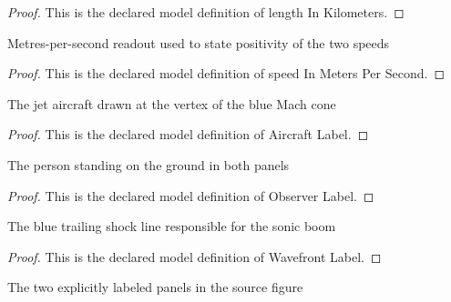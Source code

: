 \begin{proof}
  This is the declared model definition of length In Kilometers.
\end{proof}
\begin{definition}
  \label{def:physics:phyx-mini-0221:phyxminiproblems-problemphyxmini0221-speedinmeterspersecond}
  Metres-per-second readout used to state positivity of the two speeds
\end{definition}
\begin{proof}
  This is the declared model definition of speed In Meters Per Second.
\end{proof}
\begin{definition}
  \label{def:physics:phyx-mini-0221:phyxminiproblems-problemphyxmini0221-aircraftlabel}
  The jet aircraft drawn at the vertex of the blue Mach cone
\end{definition}
\begin{proof}
  This is the declared model definition of Aircraft Label.
\end{proof}
\begin{definition}
  \label{def:physics:phyx-mini-0221:phyxminiproblems-problemphyxmini0221-observerlabel}
  The person standing on the ground in both panels
\end{definition}
\begin{proof}
  This is the declared model definition of Observer Label.
\end{proof}
\begin{definition}
  \label{def:physics:phyx-mini-0221:phyxminiproblems-problemphyxmini0221-wavefrontlabel}
  The blue trailing shock line responsible for the sonic boom
\end{definition}
\begin{proof}
  This is the declared model definition of Wavefront Label.
\end{proof}
\begin{definition}
  \label{def:physics:phyx-mini-0221:phyxminiproblems-problemphyxmini0221-figurepanel}
  The two explicitly labeled panels in the source figure
\end{definition}
